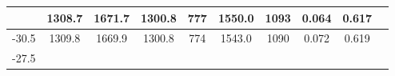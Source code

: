 \documentclass[a4paper,12pt]{article}
\begin{document}
\begin{longtable}{
     |
%    
    c|
%    
    c|
%    
    c|
%    
    c|
%    
    c|
%    
    c|
%    
    c|
%    
    c|
%    
    c|
%    
    c|
%    
    }
%        
        & 1308.7
%        

%        

%        
        & 1671.7
%        

%        

%        
        & 1300.8
%        

%        

%        
        & 777
%        

%        

%        
        & 1550.0
%        

%        

%        
        & 1093
%        

%        

%        
        & 0.064
%        

%        

%        
        & 0.617
%        

%        
        \\
        \hline

        

%        

%        
        -30.5
%        

%        

%        
        & 1309.8
%        

%        

%        
        & 1669.9
%        

%        

%        
        & 1300.8
%        

%        

%        
        & 774
%        

%        

%        
        & 1543.0
%        

%        

%        
        & 1090
%        

%        

%        
        & 0.072
%        

%        

%        
        & 0.619
%        

%        
        \\
        \hline

        

%        

%        
        -27.5
%        

%        


\end{longtable}
\end{document}
